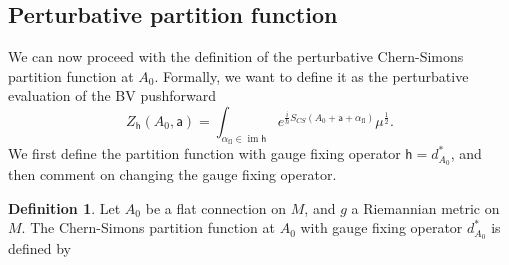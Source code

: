 \documentclass[11pt,a4paper]{amsart}
\theoremstyle{plain} %
\theoremstyle{definition}
\newtheorem{defn}[thm]{Definition}
\theoremstyle{remark}
\newcommand{\dd}{d}
\newcommand{\Det}{\operatorname{Det}}
\newcommand{\Sym}{\operatorname{Sym}}
\newcommand{\mr}{\mathrm}
\newcommand{\sfa}{\mathsf{a}}
\newcommand{\sh}{\mathsf{h}}
\begin{document}
{\subsection{Perturbative partition function}\label{ss perturbative partition function}
We can now proceed with the definition of  the perturbative Chern-Simons partition function at $A_0$.  %
Formally, we want to define it as the perturbative evaluation of the BV pushforward 
$$ Z_\sh(A_0,\sfa) = \int_{\alpha_\mr{fl} \in \operatorname{im} \sh}e^{\frac{i}{\hbar}S_{CS}(A_0 + \sfa+\alpha_\mr{fl})}\mu^{\frac{1}{2}}. $$
We first define the partition function with gauge fixing operator $\sh=d^*_{A_0}$, and then comment on changing the gauge fixing operator. 
\begin{defn} \label{def: Z pert} Let $A_0$ be a flat connection on $M$, and $g$ a Riemannian metric on $M$. The Chern-Simons partition function at $A_0$ with gauge fixing operator $d^*_{A_0}$ is %
defined by

\end{defn}}
\end{document}
